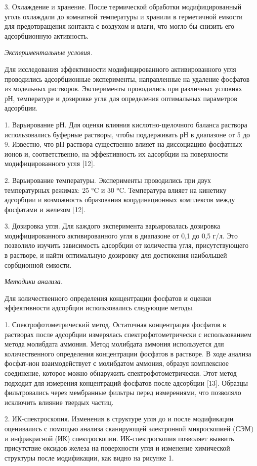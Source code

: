 3. Охлаждение и хранение. После термической обработки модифицированный
уголь охлаждали до комнатной температуры и хранили в герметичной емкости
для предотвращения контакта с воздухом и влаги, что могло бы снизить его
адсорбционную активность.

\emph{Экспериментальные условия.}

Для исследования эффективности модифицированного активированного угля
проводились адсорбционные эксперименты, направленные на удаление
фосфатов из модельных растворов. Эксперименты проводились при различных
условиях рН, температуре и дозировке угля для определения оптимальных
параметров адсорбции.

1. Варьирование рН. Для оценки влияния кислотно-щелочного баланса
раствора использовались буферные растворы, чтобы поддерживать рН в
диапазоне от 5 до 9. Известно, что рН раствора существенно влияет на
диссоциацию фосфатных ионов и, соответственно, на эффективность их
адсорбции на поверхности модифицированного угля {[}12{]}.

2. Варьирование температуры. Эксперименты проводились при двух
температурных режимах: 25 °C и 30 °C. Температура влияет на кинетику
адсорбции и возможность образования координационных комплексов между
фосфатами и железом {[}12{]}.

3. Дозировка угля. Для каждого эксперимента варьировалась дозировка
модифицированного активированного угля в диапазоне от 0,1 до 0,5 г/л.
Это позволило изучить зависимость адсорбции от количества угля,
присутствующего в растворе, и найти оптимальную дозировку для достижения
наибольшей сорбционной емкости.

\emph{Методики анализа.}

Для количественного определения концентрации фосфатов и оценки
эффективности адсорбции использовались следующие методы.

1. Спектрофотометрический метод. Остаточная концентрация фосфатов в
растворах после адсорбции измерялась спектрофотометрически с
использованием метода молибдата аммония. Метод молибдата аммония
используется для количественного определения концентрации фосфатов в
растворе. В ходе анализа фосфат-ион взаимодействует с молибдатом
аммония, образуя комплексное соединение, которое можно обнаружить
спектрофотометрически. Этот метод подходит для измерения концентраций
фосфатов после адсорбции {[}13{]}. Образцы фильтровались через
мембранные фильтры перед измерениями, что позволяло исключить влияние
твердых частиц.

2. ИК-спектроскопия. Изменения в структуре угля до и после модификации
оценивались с помощью анализа сканирующей электронной микроскопией (СЭМ)
и инфракрасной (ИК) спектроскопии. ИК-спектроскопия позволяет выявить
присутствие оксидов железа на поверхности угля и изменение химической
структуры после модификации, как видно на рисунке 1.

